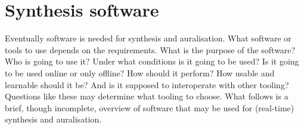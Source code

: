 %
%
%
%
%
%
%
\section{Synthesis software}\label{sec:theory:auralisation:software}
Eventually software is needed for synthesis and auralisation. What software or
tools to use depends on the requirements. What is the purpose of the software?
Who is going to use it? Under what conditions is it going to be used? Is it
going to be used online or only offline? How should it perform? How usable and
learnable should it be? And is it supposed to interoperate with other tooling?
Questions like these may determine what tooling to choose. What follows is a
brief, though incomplete, overview of software that may be used for (real-time)
synthesis and auralisation.

